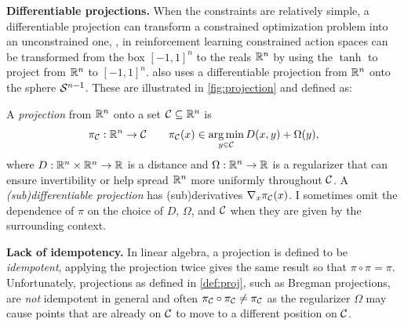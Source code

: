 \textbf{Differentiable projections.}
When the constraints are relatively simple, a differentiable projection
can transform a constrained optimization problem into an unconstrained one,
\eg, in reinforcement learning constrained action spaces can be transformed
from the box $[-1,1]^n$ to the reals $\mathbb{R}^n$ by using
the $\tanh$ to project from $\mathbb{R}^n$ to $[-1,1]^n$.
 also uses a differentiable projection from $\mathbb{R}^n$
onto the sphere ${\mathcal{S}}^{n-1}$.
These are illustrated in \cref{fig:projection} and defined as:
\begin{definition}
  A \emph{projection} from $\mathbb{R}^n$ onto a set ${\mathcal{C}}\subseteq \mathbb{R}^n$ is
  \begin{equation}
    \pi_{\mathcal{C}}: \mathbb{R}^n\rightarrow {\mathcal{C}} \qquad \pi_{\mathcal{C}}(x) \in \operatorname*{arg\,min}_{y\in{\mathcal{C}}} D(x, y) + \Omega(y),
    \label{eq:proj}
  \end{equation}
  where $D: \mathbb{R}^n\times\mathbb{R}^n\rightarrow \mathbb{R}$ is a distance and $\Omega:\mathbb{R}^n\rightarrow \mathbb{R}$ is
  a regularizer that can ensure invertibility or help spread $\mathbb{R}^n$ more uniformly throughout ${\mathcal{C}}$.
  A \emph{(sub)differentiable projection} has (sub)derivatives $\nabla_x \pi_{\mathcal{C}}(x)$.
  I sometimes omit the dependence of $\pi$ on the choice of $D$, $\Omega$, and ${\mathcal{C}}$
  when they are given by the surrounding context.
  \label{def:proj}
\end{definition}

\textbf{Lack of idempotency.} In linear algebra, a projection is defined to
be \emph{idempotent}, \ie applying the projection twice gives the same result
so that $\pi\circ \pi=\pi$.
Unfortunately, projections as defined in \cref{def:proj},
such as Bregman projections, are \emph{not} idempotent in general
and often $\pi_{\mathcal{C}}\circ \pi_{\mathcal{C}}\neq \pi_{\mathcal{C}}$
as the regularizer $\Omega$ may cause points that are already on ${\mathcal{C}}$
to move to a different position on ${\mathcal{C}}$.

